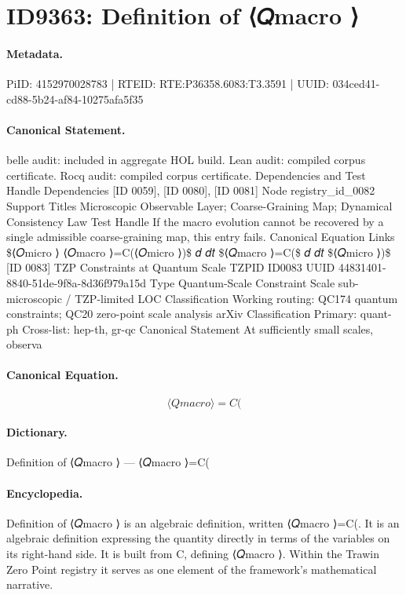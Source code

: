 \section*{ID9363: Definition of ⟨𝑄macro ⟩}
\paragraph{Metadata.}
PiID: 4152970028783 | RTEID: RTE:P36358.6083:T3.3591 | UUID: 034ced41-cd88-5b24-af84-10275afa5f35

\paragraph{Canonical Statement.}
belle audit: included in aggregate HOL build. Lean audit: compiled corpus certificate. Rocq audit: compiled corpus certificate. Dependencies and Test Handle Dependencies [ID 0059], [ID 0080], [ID 0081] Node registry\_id\_0082 Support Titles Microscopic Observable Layer; Coarse-Graining Map; Dynamical Consistency Law Test Handle If the macro evolution cannot be recovered by a single admissible coarse-graining map, this entry fails. Canonical Equation Links \$⟨𝑂micro ⟩ ⟨𝑂macro ⟩=C(⟨𝑂micro ⟩)\$ 𝑑 𝑑𝑡 \$⟨𝑄macro ⟩=C(\$ 𝑑 𝑑𝑡 \$⟨𝑄micro ⟩)\$ [ID 0083] TZP Constraints at Quantum Scale TZPID ID0083 UUID 44831401-8840-51de-9f8a-8d36f979a15d Type Quantum-Scale Constraint Scale sub-microscopic / TZP-limited LOC Classification Working routing: QC174 quantum constraints; QC20 zero-point scale analysis arXiv Classification Primary: quant-ph Cross-list: hep-th, gr-qc Canonical Statement At sufficiently small scales, observa

\paragraph{Canonical Equation.}
\[
⟨𝑄macro ⟩=C(
\]

\paragraph{Dictionary.}
Definition of ⟨𝑄macro ⟩ — ⟨𝑄macro ⟩=C(

\paragraph{Encyclopedia.}
Definition of ⟨𝑄macro ⟩ is an algebraic definition, written ⟨𝑄macro ⟩=C(. It is an algebraic definition expressing the quantity directly in terms of the variables on its right-hand side. It is built from C, defining ⟨𝑄macro ⟩. Within the Trawin Zero Point registry it serves as one element of the framework's mathematical narrative.
